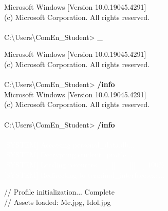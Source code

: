 \documentclass{article}
\begin{document}
\pagecolor{CMD_Black}
\color{CMD_Gray}

\noindent Microsoft Windows [Version 10.0.19045.4291]\\
(c) Microsoft Corporation. All rights reserved.\\
\\
C:\textbackslash Users\textbackslash ComEn\_Student> \_ %

\newpage
\noindent Microsoft Windows [Version 10.0.19045.4291]\\
(c) Microsoft Corporation. All rights reserved.\\
\\
C:\textbackslash Users\textbackslash ComEn\_Student> \textbf{/info} \\

\newpage
\noindent Microsoft Windows [Version 10.0.19045.4291]\\
(c) Microsoft Corporation. All rights reserved.\\
\\
C:\textbackslash Users\textbackslash ComEn\_Student> \textbf{/info} \\
\\
\textcolor{white}{[SYSTEM] Accessing personal\_data.db...}\\
\textcolor{white}{[SYSTEM] Decrypting student\_profile...}\\
\textcolor{white}{[SYSTEM] Loading resources... [||||||||||||||||||] 100\%}\\
\textcolor{white}{[SYSTEM] Redirecting to terminal\_interface.exe...}

\newpage
\pagecolor{VSCodeBG}
\color{white}

\noindent
\textcolor{CommentGreen}{// Profile initialization... Complete} \\
\textcolor{CommentGreen}{// Assets loaded: Me.jpg, Idol.jpg} \\
\end{document}
